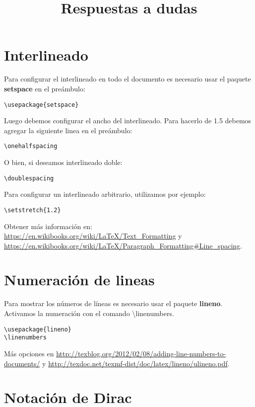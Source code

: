 \documentclass[a4paper,11pt]{article}
\title{\textbf{Respuestas a dudas}}
\date{}
\begin{document}
\maketitle

\section{Interlineado}

Para configurar el interlineado en todo el documento es necesario usar el paquete \textbf{setspace} en el preámbulo:
\begin{verbatim}
\usepackage{setspace}
\end{verbatim}

Luego debemos configurar el ancho del interlineado. Para hacerlo de 1.5 debemos agregar la siguiente linea en el preámbulo:
\begin{verbatim}
\onehalfspacing
\end{verbatim}

O bien, si deseamos interlineado doble:
\begin{verbatim}
\doublespacing
\end{verbatim}

Para configurar un interlineado arbitrario, utilizamos por ejemplo:
\begin{verbatim}
\setstretch{1.2}
\end{verbatim}


Obtener más información en: \url{https://en.wikibooks.org/wiki/LaTeX/Text_Formatting} y \url{https://en.wikibooks.org/wiki/LaTeX/Paragraph_Formatting#Line_spacing}.


\section{Numeración de lineas}

Para mostrar los números de líneas es necesario usar el paquete \textbf{lineno}. Activamos la numeración con el comando \textbackslash linenumbers.

\begin{verbatim}
\usepackage{lineno}
\linenumbers
\end{verbatim}

Más opciones en \url{http://texblog.org/2012/02/08/adding-line-numbers-to-documents/} y \url{http://texdoc.net/texmf-dist/doc/latex/lineno/ulineno.pdf}.

\section{Notación de Dirac}
\end{document}
